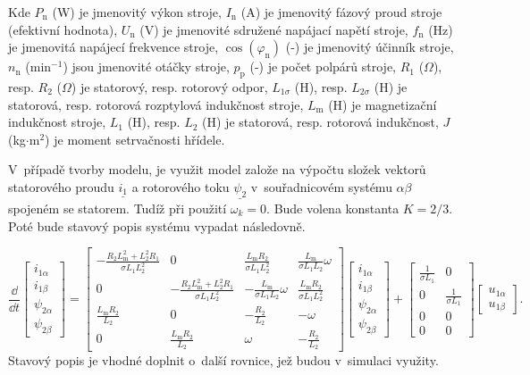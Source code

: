 \documentclass[a4paper, twoside, 11pt]{article}
\begin{document}
        \vspace*{1cm}
Kde $P_\text{n}$ (W) je jmenovitý výkon stroje, $I_\text{n}$ (A) je jmenovitý fázový proud stroje (efektivní hodnota), $U_\text{n}$ (V) je jmenovité sdružené napájací napětí stroje, $f_\text{n}$ (Hz) je jmenovitá napájecí frekvence stroje, $\cos(\varphi_\text{n})$ (-) je jmenovitý účinník stroje, $n_\text{n}$ (min$^{-1}$) jsou jmenovité otáčky stroje, $p_\text{p}$ (-) je počet polpárů stroje, $R_1$ ($\Omega$), resp. $R_2$ ($\Omega$) je statorový, resp. rotorový odpor, $L_{1\sigma}$ (H), resp. $L_{2\sigma}$ (H) je statorová, resp. rotorová rozptylová  indukčnost stroje, $L_\text{m}$ (H) je magnetizační indukčnost stroje, $L_1$ (H), resp. $L_2$ (H) je statorová, resp. rotorová indukčnost, $J$ (kg$\cdot$m$^{2}$) je moment setrvačnosti hřídele.\par
V~případě tvorby modelu, je využit model založe na výpočtu složek vektorů statorového proudu $\underline{i_1}$ a rotorového toku $\underline{\psi_2}$ v~souřadnicovém systému $\alpha\beta$ spojeném se statorem. Tudíž při použití $\omega_k = 0$. Bude volena konstanta $K = 2/3$. Poté bude stavový popis systému vypadat následovně.

\begin{equation}
    \frac{\dd{}}{\dd{t}}
    \begin{bmatrix}
        i_{1\alpha}\\
        i_{1\beta}\\
        \psi_{2\alpha}\\
        \psi_{2\beta}
    \end{bmatrix}
    =
    \begin{bmatrix}
        -\frac{R_2 L_\text{m}^{2} + L_2^2 R_1}{\sigma L_1 L_2^2} & 0 & \frac{L_\text{m} R_2}{\sigma L_1 L_2^2} & \frac{L_\text{m}}{\sigma L_1 L_2} \omega\\
        0 & - \frac{R_2 L_\text{m}^2 + L_2^2 R_1}{\sigma L_1 L_2^2} & - \frac{L_\text{m}}{\sigma L_1 L_2} \omega & \frac{L_\text{m} R_2}{\sigma L_1 L_2^2}\\
        \frac{L_\text{m} R_2}{L_2} & 0 & - \frac{R_2}{L_2} & -\omega\\
        0 & \frac{L_\text{m} R_2}{L_2} & \omega & -\frac{R_2}{L_2}
    \end{bmatrix}
    \begin{bmatrix}
        i_{1\alpha}\\
        i_{1\beta}\\
        \psi_{2\alpha}\\
        \psi_{2\beta}
    \end{bmatrix}
    +
    \begin{bmatrix}
        \frac{1}{\sigma L_1} & 0\\
        0 & \frac{1}{\sigma L_1}\\
        0 & 0\\
        0 & 0
    \end{bmatrix}
    \begin{bmatrix}
        u_{1\alpha}\\
        u_{1\beta}
    \end{bmatrix}.
\end{equation}
Stavový popis je vhodné doplnit o~další rovnice, jež budou v~simulaci využity.
\end{document}
